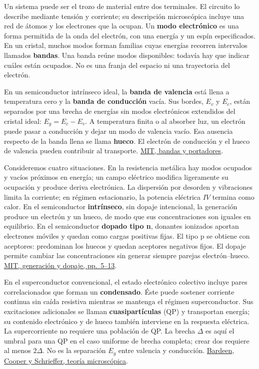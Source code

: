 \documentclass[
  spanish,
  10pt,
  a4paper,
]{article}
\begin{document}
Un sistema puede ser el trozo de material entre dos terminales. El
circuito lo describe mediante tensión y corriente; su descripción
microscópica incluye una red de átomos y los electrones que la ocupan.
Un \textbf{modo electrónico} es una forma permitida de la onda del
electrón, con una energía y un espín especificados. En un cristal,
muchos modos forman familias cuyas energías recorren intervalos llamados
\textbf{bandas}. Una banda reúne modos disponibles: todavía hay que
indicar cuáles están ocupados. No es una franja del espacio ni una
trayectoria del electrón.

En un semiconductor intrínseco ideal, la \textbf{banda de valencia} está
llena a temperatura cero y la \textbf{banda de conducción} vacía. Sus
bordes, \(E_v\) y \(E_c\), están separados por una brecha de energías
sin modos electrónicos extendidos del cristal ideal: \(E_g=E_c-E_v\). A
temperatura finita o al absorber luz, un electrón puede pasar a
conducción y dejar un modo de valencia vacío. Esa ausencia respecto de
la banda llena se llama \textbf{hueco}. El electrón de conducción y el
hueco de valencia pueden contribuir al transporte.
\href{https://ocw.mit.edu/courses/3-091sc-introduction-to-solid-state-chemistry-fall-2010/pages/electronic-materials/14-semiconductors/}{MIT,
bandas y portadores}.

Consideremos cuatro situaciones. En la resistencia metálica hay modos
ocupados y vacíos próximos en energía; un campo eléctrico modifica
ligeramente su ocupación y produce deriva electrónica. La dispersión por
desorden y vibraciones limita la corriente; en régimen estacionario, la
potencia eléctrica \(IV\) termina como calor. En el semiconductor
\textbf{intrínseco}, sin dopaje intencional, la generación produce un
electrón y un hueco, de modo que sus concentraciones son iguales en
equilibrio. En el semiconductor \textbf{dopado tipo n}, donantes
ionizados aportan electrones móviles y quedan como cargas positivas
fijas. El tipo p se obtiene con aceptores: predominan los huecos y
quedan aceptores negativos fijos. El dopaje permite cambiar las
concentraciones sin generar siempre parejas electrón--hueco.
\href{https://ocw.mit.edu/courses/6-012-microelectronic-devices-and-circuits-spring-2009/6583f0018f5bb90464ea68b550f73c95_MIT6_012S09_lec02.pdf}{MIT,
generación y dopaje, pp.~5--13}.

En el superconductor convencional, el estado electrónico colectivo
incluye pares correlacionados que forman un \textbf{condensado}. Éste
puede sostener corriente continua sin caída resistiva mientras se
mantenga el régimen superconductor. Sus excitaciones adicionales se
llaman \textbf{cuasipartículas} (QP) y transportan energía; su contenido
electrónico y de hueco también interviene en la respuesta eléctrica. La
supercorriente no requiere una población de QP. La brecha \(\Delta\) es
aquí el umbral para una QP en el caso uniforme de brecha completa; crear
dos requiere al menos \(2\Delta\). No es la separación \(E_g\) entre
valencia y conducción.
\href{https://journals.aps.org/pr/abstract/10.1103/PhysRev.108.1175}{Bardeen,
Cooper y Schrieffer, teoría microscópica}.
\end{document}
